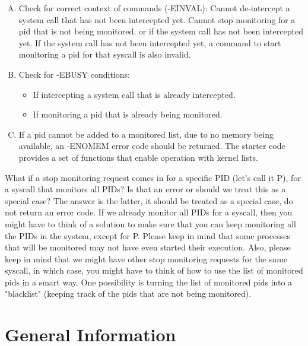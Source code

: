 \documentclass[12pt]{article}
\begin{document}
\begin{itemize}
\begin{enumerate}[A.]
    \item Check for correct context of commands (-EINVAL):
    Cannot de-intercept a system call that has not been intercepted yet.
    Cannot stop monitoring for a pid that is not being monitored, or \color{red}if
    the system call has not been intercepted yet. If the system call has not been
    intercepted yet, a command to start monitoring a pid for that syscall is also
    invalid\color{black}.
    \item Check for -EBUSY conditions:
    \begin{itemize}
        \item If intercepting a system call that is already intercepted.
        \item If monitoring a pid that is already being monitored.
    \end{itemize}
    \item If a pid cannot be added to a monitored list, due to no memory being available, an -ENOMEM error code should be returned. The starter code provides a set of functions that enable operation with kernel lists.
    \end{enumerate}

    \bigskip

    What if a stop monitoring request comes in for a specific PID (let's call it P),
    for a syscall that monitors all PIDs? Is that an error or should we treat
    this as a special case? The answer is the latter, it should be treated as a
    special case, do not return an error code. If we already monitor all PIDs for
    a syscall, then you might have to think of a solution to make sure that you
    can keep monitoring all the PIDs in the system, except for P. Please keep in
    mind that some processes that will be monitored may not have even started
    their execution. Also, please keep in mind that we might have other stop
    monitoring requests for the same syscall, in which case, you might have to
    think of how to use the list of monitored pids in a smart way. One possibility
    is turning the list of monitored pids into a "blacklist" (keeping track of the
    pids that are not being monitored).
\end{itemize}

\section{General Information}
\end{document}
